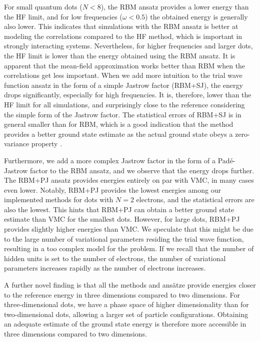For small quantum dots ($N<8$), the RBM ansatz provides a lower energy than the HF limit, and for low frequencies ($\omega<0.5$) the obtained energy is generally also lower. This indicates that simulations with the RBM ansatz is better at modeling the correlations compared to the HF method, which is important in strongly interacting systems. Nevertheless, for higher frequencies and larger dots, the HF limit is lower than the energy obtained using the RBM ansatz. It is apparent that the mean-field approximation works better than RBM when the correlations get less important. When we add more intuition to the trial wave function ansatz in the form of a simple Jastrow factor (RBM+SJ), the energy drops significantly, especially for high frequencies. It is, therefore, lower than the HF limit for all simulations, and surprisingly close to the reference considering the simple form of the Jastrow factor. The statistical errors of RBM+SJ is in general smaller than for RBM, which is a good indication that the method provides a better ground state estimate as the actual ground state obeys a zero-variance property \supercite{assaraf_zero-variance_2003}. 

Furthermore, we add a more complex Jastrow factor in the form of a Padé-Jastrow factor to the RBM ansatz, and we observe that the energy drops further. The RBM+PJ ansatz provides energies entirely on par with VMC, in many cases even lower. Notably, RBM+PJ provides the lowest energies among our implemented methods for dots with $N=2$ electrons, and the statistical errors are also the lowest. This hints that RBM+PJ can obtain a better ground state estimate than VMC for the smallest dots. However, for large dots, RBM+PJ provides slightly higher energies than VMC. We speculate that this might be due to the large number of variational parameters residing the trial wave function, resulting in a too complex model for the problem. If we recall that the number of hidden units is set to the number of electrons, the number of variational parameters increases rapidly as the number of electrons increases. 

A further novel finding is that all the methods and ansätze provide energies closer to the reference energy in three dimensions compared to two dimensions. For three-dimensional dots, we have a phase space of higher dimensionality than for two-dimensional dots, allowing a larger set of particle configurations. Obtaining an adequate estimate of the ground state energy is therefore more accessible in three dimensions compared to two dimensions.

